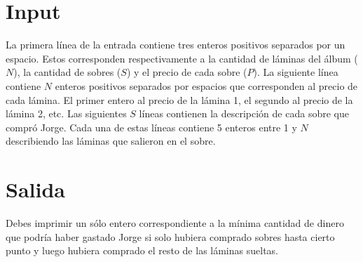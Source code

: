 \documentclass{article}
\begin{document}
\section*{Input}

La primera línea de la entrada contiene tres enteros positivos separados por un
espacio. Estos corresponden respectivamente a la cantidad de láminas del álbum
($N$), la cantidad de sobres ($S$) y el precio de cada sobre ($P$). La siguiente
línea contiene $N$ enteros positivos separados por espacios que corresponden
al precio de cada lámina. El primer entero al precio de la lámina 1, el segundo
al precio de la lámina 2, etc. Las siguientes $S$ líneas contienen la
descripción de cada sobre que compró Jorge. Cada una de estas líneas contiene 5
enteros entre 1 y $N$ describiendo las láminas que salieron en el sobre.

\section*{Salida}

Debes imprimir un sólo entero correspondiente a la mínima cantidad de dinero que
podría haber gastado Jorge si solo hubiera comprado sobres hasta cierto punto y
luego hubiera comprado el resto de las láminas sueltas.


 
\end{document}
